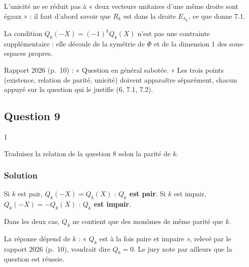 \documentclass[11pt,a4paper]{article}
\begin{document}
\begin{piege}

L'unicité ne se réduit pas à « deux vecteurs unitaires d'une même droite sont égaux » : il faut d'abord savoir que \(R_k\) est dans la droite \(E_{\lambda_k}\), ce que donne 7.1.

\end{piege}

\begin{methode}

La condition \(Q_k(-X)=(-1)^kQ_k(X)\) n'est pas une contrainte supplémentaire : elle découle de la symétrie de \(\Phi\) et de la dimension 1 des sous-espaces propres.

\end{methode}

\begin{jury}

Rapport 2026 (p.~10) : « Question en général sabotée. » Les trois points (existence, relation de parité, unicité) doivent apparaître séparément, chacun appuyé sur la question qui le justifie (6, 7.1, 7.2).

\end{jury}

\hypertarget{question-9}{%
\subsection{Question 9}\label{question-9}}

\begin{indication}{1}

Traduisez la relation de la question 8 selon la parité de \(k\).

\end{indication}

\hypertarget{solution-29}{%
\subsubsection{Solution}\label{solution-29}}

Si \(k\) est pair, \(Q_k(-X)=Q_k(X)\) : \textbf{\(Q_k\) est pair}. Si \(k\) est impair, \(Q_k(-X)=-Q_k(X)\) : \textbf{\(Q_k\) est impair}.

Dans les deux cas, \(Q_k\) ne contient que des monômes de même parité que \(k\).

\begin{piege}

La réponse dépend de \(k\) : « \(Q_k\) est à la fois paire et impaire », relevé par le rapport 2026 (p.~10), voudrait dire \(Q_k=0\). Le jury note par ailleurs que la question est réussie.

\end{piege}
\end{document}
